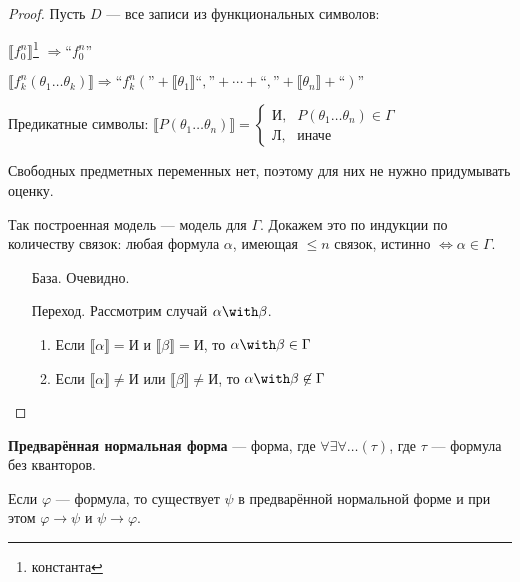 \begin{proof}
    Пусть \(D\) --- все записи из функциональных символов:

    \(\llbracket f_0^n \rrbracket\)\footnote{константа} \( \Rightarrow \text{``}f_0^n\text{''}\)

    \(\llbracket f_k^n(\theta_1 \dots \theta_k) \rrbracket \Rightarrow \text{``}f_k^n(\text{''} + \llbracket \theta_1 \rrbracket \text{``},\text{''} + \cdots + \text{``},\text{''} + \llbracket \theta_n \rrbracket + \text{``})\text{''}\)

    Предикатные символы: \(\llbracket P(\theta_1 \dots \theta_n) \rrbracket = \begin{cases} \text{И}, & P(\theta_1 \dots \theta_n) \in \Gamma \\ \text{Л}, & \text{иначе} \end{cases} \)

    Свободных предметных переменных нет, поэтому для них не нужно придумывать оценку.

    Так построенная модель --- модель для \(\Gamma\). Докажем это по индукции по количеству связок: любая формула \(\alpha\), имеющая \( \leq n\) связок, истинно \(\Leftrightarrow \alpha \in \Gamma\).

    \begin{itemize}
        \item [База.] Очевидно.
        \item [Переход.] Рассмотрим случай \(\alpha \with \beta\).

              \begin{enumerate}
                  \item Если \(\llbracket \alpha \rrbracket = \text{И}\) и \(\llbracket \beta \rrbracket = \text{И}\), то \(\alpha \with \beta \in \Gamma\)
                  \item Если \(\llbracket \alpha \rrbracket \neq \text{И}\) или \(\llbracket \beta \rrbracket \neq \text{И}\), то \(\alpha \with \beta \not\in \Gamma\)
              \end{enumerate}
    \end{itemize}
\end{proof}

\begin{definition}
    \textbf{Предварённая нормальная форма} --- форма, где \(\forall \exists \forall \dots (\tau)\), где \(\tau\) --- формула без кванторов.
\end{definition}
\begin{theorem}
    Если \(\varphi\) --- формула, то существует \(\psi\) в предварённой нормальной форме и при этом \(\varphi \to \psi\) и \(\psi \to \varphi\).
\end{theorem}


